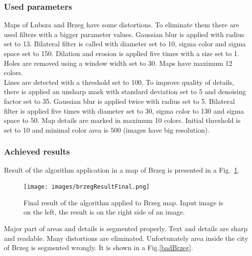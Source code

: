 \documentclass[a4paper,onecolumn,oneside,12pt]{memoir}
\begin{document}
\subsubsection{Used parameters}

Maps of Lubsza and Brzeg have some distortions. To eliminate them there are used filters with a
bigger parameter values. Gaussian blur is applied with radius set to 13. Bilateral filter is
called with diameter set to 10, sigma color and sigma space set to 150. Dilation and erosion is
applied five times with a size set to 1. Holes are removed using a window width set to 30. Maps
have maximum 12 colors. \\

Lines are detected with a threshold set to 100. To improve quality of details, there is applied an
unsharp mask with standard deviation set to 5 and denoising factor set to 35. Gaussian blur is
applied twice with radius set to 5. Bilateral filter is applied five times with diameter set to 30,
sigma color to 130 and sigma space to 50. Map details are marked in maximum 10 colors. Initial
threshold is set to 10 and minimal color area is 500 (images have big resolution).

\subsubsection{Achieved results}

Result of the algorithm application in a map of Brzeg is presented in a Fig.~\ref{brzegResult}.

\begin{figure}[!ht]
\begin{center}
\texttt{[image: images/brzegResultFinal.png]}
\caption{Final result of the algorithm applied to Brzeg map. Input image is on the left, the result
is on the right side of an image.}
\label{brzegResult}
\end{center}
\end{figure}

Major part of areas and details is segmented properly. Text and details are sharp and readable.
Many distortions are eliminated. Unfortunately area inside the city of Brzeg is segmented wrongly.
It is shown in a Fig.\ref{badBrzeg}.
\end{document}
